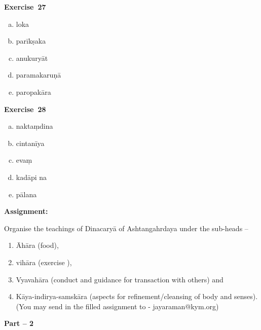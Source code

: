 \begin{multicols}{2}
\noindent\textbf{Exercise~27}
\vspace{-10pt}
\begin{enumerate}[a.]
\itemsep=0pt
\item loka 
\item parīkṣaka 
\item anukuryāt 
\item paramakaruṇā
\item paropakāra
\end{enumerate}

\noindent\textbf{Exercise~28}
\vspace{-10pt}
\begin{enumerate}[a.]
\itemsep=0pt
\item naktaṃdina 
\item cintanīya
\item evaṃ 
\item kadāpi na
\item pālana
\end{enumerate}
\end{multicols}

\begin{center}
\textbf{Assignment:}
\end{center}

Organise the teachings of Dinacaryā of Ashtangahrdaya under the sub-heads –

\begin{enumerate}
\item Āhāra (food),
\item vihāra (exercise ),
\item Vyavahāra (conduct and guidance for transaction with others) and
\item Kāya-indirya-samskāra (aspects for refinement/cleansing of body and senses). (You may send in the filled assignment to - jayaraman@kym.org)
\end{enumerate}
\newpage

\centerline{\textbf{Part -- 2}}

